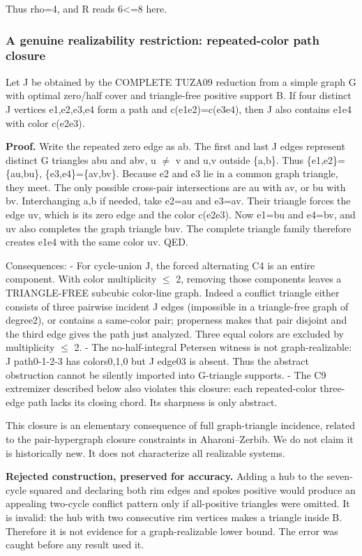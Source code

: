 \documentclass[11pt]{article}
\begin{document}
Thus rho=4, and R reads 6\textless=8 here.

\subsubsection{A genuine realizability restriction: repeated-color path closure}\label{a-genuine-realizability-restriction-repeated-color-path-closure}

Let J be obtained by the COMPLETE TUZA09 reduction from a simple graph G with optimal zero/half cover and triangle-free positive support B. If four distinct J vertices e1,e2,e3,e4 form a path and c(e1e2)=c(e3e4), then J also contains e1e4 with color c(e2e3).

\textbf{Proof.} Write the repeated zero edge as ab. The first and last J edges represent distinct G triangles abu and abv, u \(\ne\) v and u,v outside \{a,b\}. Thus \{e1,e2\}=\{au,bu\}, \{e3,e4\}=\{av,bv\}. Because e2 and e3 lie in a common graph triangle, they meet. The only possible cross-pair intersections are au with av, or bu with bv. Interchanging a,b if needed, take e2=au and e3=av. Their triangle forces the edge uv, which is its zero edge and the color c(e2e3). Now e1=bu and e4=bv, and uv also completes the graph triangle buv. The complete triangle family therefore creates e1e4 with the same color uv. QED.

Consequences: - For cycle-union J, the forced alternating C4 is an entire component. With color multiplicity \(\le\) 2, removing those components leaves a TRIANGLE-FREE subcubic color-line graph. Indeed a conflict triangle either consists of three pairwise incident J edges (impossible in a triangle-free graph of degree2), or contains a same-color pair; properness makes that pair disjoint and the third edge gives the path just analyzed. Three equal colors are excluded by multiplicity \(\le\) 2. - The no-half-integral Petersen witness is not graph-realizable: J path0-1-2-3 has colors0,1,0 but J edge03 is absent. Thus the abstract obstruction cannot be silently imported into G-triangle supports. - The C9 extremizer described below also violates this closure: each repeated-color three-edge path lacks its closing chord. Its sharpness is only abstract.

This closure is an elementary consequence of full graph-triangle incidence, related to the pair-hypergraph closure constraints in Aharoni--Zerbib. We do not claim it is historically new. It does not characterize all realizable systems.

\textbf{Rejected construction, preserved for accuracy.} Adding a hub to the seven-cycle squared and declaring both rim edges and spokes positive would produce an appealing two-cycle conflict pattern only if all-positive triangles were omitted. It is invalid: the hub with two consecutive rim vertices makes a triangle inside B. Therefore it is not evidence for a graph-realizable lower bound. The error was caught before any result used it.
\end{document}
